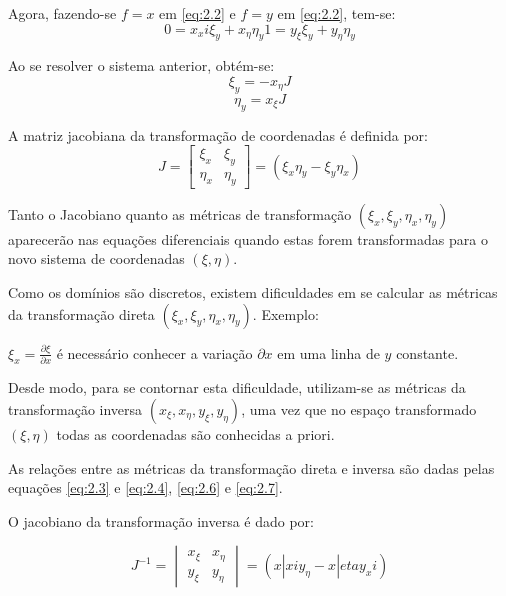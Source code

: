 Agora, fazendo-se $f=x$ em \ref{eq:2.2} e $f=y$ em \ref{eq:2.2}, tem-se:
\begin{equation*}
    0 = x_xi \xi_y + x_\eta \eta_y
    1 = y_\xi \xi_y + y_\eta \eta_y
\end{equation*}

Ao se resolver o sistema anterior, obtém-se:
\begin{equation}
    \label{eq:2.6}
    \xi_y = -x_\eta J
\end{equation}
\begin{equation}
    \label{eq:2.7}
    \eta_y = x_\xi J
\end{equation}

A matriz jacobiana da transformação de coordenadas é definida por:
\begin{equation}
    \label{eq:2.8}
    J =
    \begin{bmatrix}
        \xi_x & \xi_y\\
        \eta_x & \eta_y
    \end{bmatrix}
    = (\xi_x \eta_y - \xi_y \eta_x)
\end{equation}

Tanto o Jacobiano quanto as métricas de transformação $(\xi_x, \xi_y, \eta_x, \eta_y)$ aparecerão nas equações diferenciais quando estas forem transformadas para o novo sistema de coordenadas $(\xi,\eta)$.

Como os domínios são discretos, existem dificuldades em se calcular as métricas da transformação direta $(\xi_x, \xi_y, \eta_x, \eta_y)$. Exemplo:

$\xi_x=\frac{\partial \xi}{\partial x}$ é necessário conhecer a variação $\partial x$ em uma linha de $y$ constante.

Desde modo, para se contornar esta dificuldade, utilizam-se as métricas da transformação inversa $(x_\xi, x_\eta, y_\xi, y_\eta)$, uma vez que no espaço transformado $(\xi, \eta)$ todas as coordenadas são conhecidas a priori.

As relações entre as métricas da transformação direta e inversa são dadas pelas equações \ref{eq:2.3} e \ref{eq:2.4}, \ref{eq:2.6} e \ref{eq:2.7}.

O jacobiano da transformação inversa é dado por:

\begin{equation}
    \label{eq:2.9}
    J^{-1} =
    \begin{vmatrix}
        x_\xi & x_\eta\\
        y_\xi & y_\eta
    \end{vmatrix}
    = (x|xi y_\eta - x|eta y_xi)
\end{equation}

